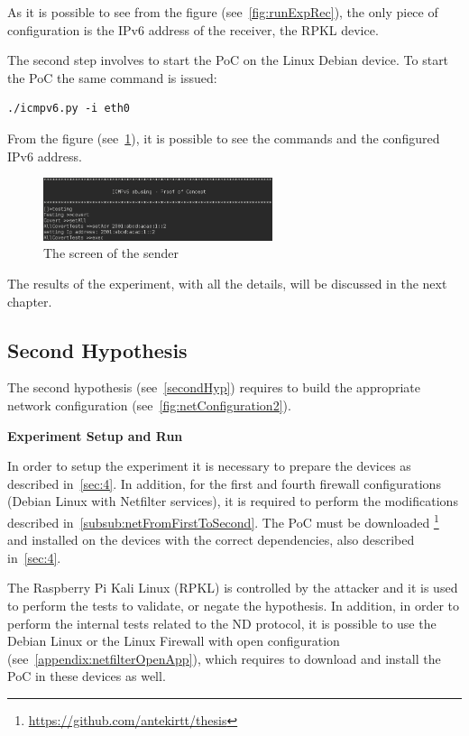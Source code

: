 \documentclass[12pt]{article}
\begin{document}
As it is possible to see from the figure (see~\ref{fig:runExpRec}), the only piece of configuration is the IPv6 address of the receiver, the RPKL device.

The second step involves to start the PoC on the Linux Debian device. To start the PoC the same command is issued:
\begin{lstlisting}[style=python,basicstyle=\ttfamily\small]
 ./icmpv6.py -i eth0
\end{lstlisting}
\vspace{-10pt}
From the figure (see~\ref{fig:runExpSend}), it is possible to see the commands and the configured IPv6 address.

\begin{figure}[ht] 
\begin{center}
\includegraphics[width=0.6\textwidth]{runExpSender}
\caption{The screen of the sender}
\label{fig:runExpSend}
\end{center}
\end{figure}

The results of the experiment, with all the details, will be discussed in the next chapter.

\subsection{Second Hypothesis}
\label{sub:secondHypExp}

The second hypothesis (see~\ref{secondHyp}) requires to build the appropriate network configuration (see~\ref{fig:netConfiguration2}).

\textbf{Experiment Setup and Run}
\label{subsub:expRun2}

In order to setup the experiment it is necessary to prepare the devices as described in~\ref{sec:4}. In addition, for the first and fourth firewall configurations (Debian Linux with Netfilter services), it is required to perform the modifications described in~\ref{subsub:netFromFirstToSecond}. The PoC must be downloaded \footnote{\url{https://github.com/antekirtt/thesis}} and installed on the devices with the correct dependencies, also described in~\ref{sec:4}.

The Raspberry Pi Kali Linux (RPKL) is controlled by the attacker and it is used to perform the tests to validate, or negate the hypothesis. In addition, in order to perform the internal tests related to the ND protocol, it is possible to use the Debian Linux or the Linux Firewall with open configuration (see~\ref{appendix:netfilterOpenApp}), which requires to download and install the PoC in these devices as well.
\end{document}
